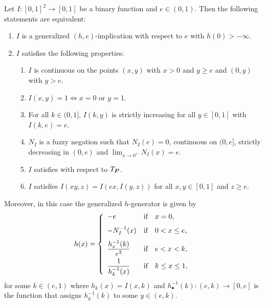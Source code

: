 \begin{theorem}\label{charach(h,e)fin} Let $I:[0,1]^2 \to [0,1]$ be a binary function and $ e \in (0,1)$. Then the following statements are equivalent:
	
	\begin{enumerate}[label=(\roman*)]
		\item $I$ is a generalized $(h,e)$-implication with respect to $e$ with $h(0)> - \infty$.
		\item $I$ satisfies the following properties:
		
		\begin{enumerate}[label=\arabic*.]
			\item $I$ is continuous on the points $(x,y)$ with $x> 0$ and $y\geq e$ and $(0,y)$ with $y>e$.
			\item $I(x,y)=1 \Leftrightarrow x=0 \text{ or } y=1$.
			\item For all $k \in (0,1]$, $I(k,y)$ is strictly increasing for all $y \in[0,1]$ with $I(k,e)=e$.
			\item $N_I$ is a fuzzy negation such that $N_I(e)=0$, continuous on $(0,e]$, strictly decreasing in $(0,e)$ and $\displaystyle \lim_{x \to 0^+}N_I(x)=e$.
			\item $I$ satisfies \LIey with respect to $T_{\bm{P}}$.
			\item $I$ satisfies $I(xy,z)=I(ex,I(y,z))$ for all $x,y \in [0,1]$ and $z\geq e$.
		\end{enumerate}
	\end{enumerate}
	Moreover, in this case the generalized $h$-generator is given by
	$$h(x)=\left\{ \begin{array}{lcl}
		-e &   \hbox{if}  & x=0, \\[0.7em]
		-N_I^{-1}(x) &  \hbox{if} & 0<x \leq e, \\[0.7em]
		\displaystyle \frac{h_x^{-1}(k)}{e^2}&  \hbox{if}  & e<x<k, \\[0.7em]
		\displaystyle \frac{1}{h_k^{-1}(x)}  &  \hbox{if}  & k \leq x \leq 1,
	\end{array}
	\right.
	$$
	for some $k \in (e,1)$ where $h_k(x)=I(x,k)$ and $h_{\bullet}^{-1}(k):(e,k)\to [0,e]$ is the function that assigns $h_y^{-1}(k)$ to some $ y \in (e,k)$.
\end{theorem}
